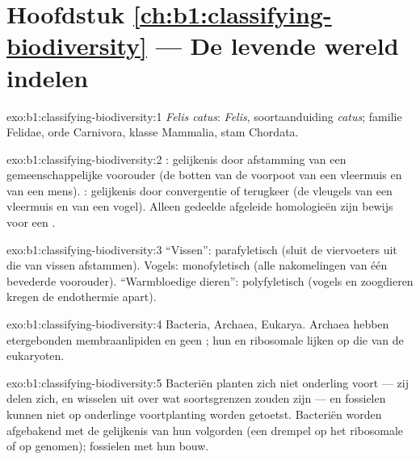 \section*{Hoofdstuk \ref{ch:b1:classifying-biodiversity} --- De levende wereld indelen}

\begin{solution}{exo:b1:classifying-biodiversity:1}
\emph{Felis catus}:  \emph{Felis}, soortaanduiding \emph{catus};
familie Felidae, orde Carnivora, klasse Mammalia, stam Chordata.
\end{solution}

\begin{solution}{exo:b1:classifying-biodiversity:2}
: gelijkenis door afstamming van een gemeenschappelijke voorouder
(de botten van de voorpoot van een vleermuis en van een mens). :
gelijkenis door convergentie of terugkeer (de vleugels van een vleermuis en
van een vogel). Alleen gedeelde afgeleide homologieën zijn bewijs voor een
.
\end{solution}

\begin{solution}{exo:b1:classifying-biodiversity:3}
``Vissen'': parafyletisch (sluit de viervoeters uit die van vissen
afstammen). Vogels: monofyletisch (alle nakomelingen van één bevederde
voorouder). ``Warmbloedige dieren'': polyfyletisch (vogels en zoogdieren
kregen de endothermie apart).
\end{solution}

\begin{solution}{exo:b1:classifying-biodiversity:4}
Bacteria, Archaea, Eukarya. Archaea hebben etergebonden membraanlipiden en
geen ; hun  en ribosomale  lijken op die
van de eukaryoten.
\end{solution}

\begin{solution}{exo:b1:classifying-biodiversity:5}
Bacteriën planten zich niet onderling voort --- zij delen zich, en wisselen
 uit over wat soortsgrenzen zouden zijn --- en fossielen kunnen niet op
onderlinge voortplanting worden getoetst. Bacteriën worden afgebakend met de
gelijkenis van hun volgorden (een drempel op het ribosomale  of op
genomen); fossielen met hun bouw.
\end{solution}

